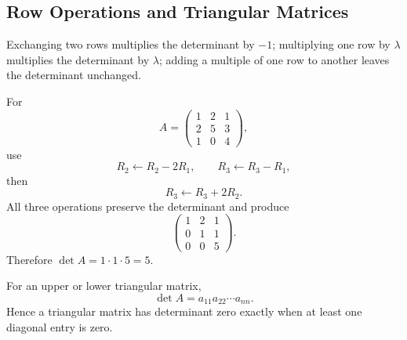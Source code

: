 \subsection{Row Operations and Triangular Matrices}

\begin{corebox}
Exchanging two rows multiplies the determinant by $-1$; multiplying one row by $\lambda$ multiplies the determinant by $\lambda$; adding a multiple of one row to another leaves the determinant unchanged.
\end{corebox}

\begin{examplebox}
For
\[
A=\begin{pmatrix}
1&2&1\\2&5&3\\1&0&4
\end{pmatrix},
\]
use
\[
R_2\leftarrow R_2-2R_1,
\qquad
R_3\leftarrow R_3-R_1,
\]
then
\[
R_3\leftarrow R_3+2R_2.
\]
All three operations preserve the determinant and produce
\[
\begin{pmatrix}
1&2&1\\0&1&1\\0&0&5
\end{pmatrix}.
\]
Therefore $\det A=1\cdot1\cdot5=5$.
\end{examplebox}

\begin{theorembox}
For an upper or lower triangular matrix,
\[
\boxed{\det A=a_{11}a_{22}\cdots a_{nn}}.
\]
Hence a triangular matrix has determinant zero exactly when at least one diagonal entry is zero.
\end{theorembox}
